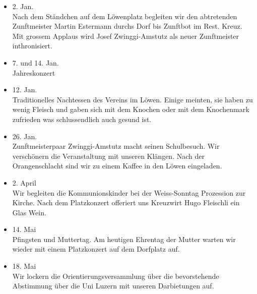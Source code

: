 \begin{history}


    \begin{itemize}

        \item[]2. Jan.\\
        Nach dem Ständchen auf dem Löwenplatz begleiten wir den abtretenden
        Zunftmeister Martin Estermann durchs Dorf bis Zunftbot im Rest. Kreuz.
        Mit grossem Applaus wird Josef Zwinggi-Amstutz als neuer Zunftmeister
        inthronisiert.

        \item[]7. und 14. Jan.\\
        Jahreskonzert

        \item[]12. Jan.\\
        Traditionelles Nachtessen des Vereins im Löwen. Einige meinten, sie
        haben zu wenig Fleisch und gaben sich mit dem Knochen oder mit dem
        Knochenmark zufrieden was schlussendlich auch gesund ist.

        \item[]26. Jan.\\
        Zunftmeisterpaar Zwinggi-Amstutz macht seinen Schulbesuch. Wir
        verschönern die Veranstaltung mit unseren Klängen. Nach der
        Orangenschlacht sind wir zu einem Kaffee in den Löwen eingeladen.

        \item[]2. April\\
        Wir begleiten die Kommunionskinder bei der Weiss-Sonntag Prozession zur
        Kirche. Nach dem Platzkonzert offeriert uns Kreuzwirt Hugo Fleischli ein
        Glas Wein.

        \item[]14. Mai\\
        Pfingsten und Muttertag. Am heutigen Ehrentag der Mutter warten wir
        wieder mit einem Platzkonzert auf dem Dorfplatz auf.

        \item[]18. Mai\\
        Wir lockern die Orientierungsversammlung über die bevorstehende
        Abstimmung über die Uni Luzern mit unseren Darbietungen auf.


\end{itemize}
\end{history}
